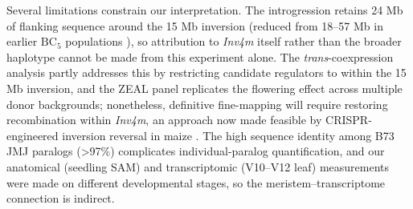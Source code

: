 \documentclass[9pt,twocolumn,twoside]{rilabRxiv}
\newcommand{\mex}{\textit{mexicana}\xspace}
\newcommand{\invfour}{\textit{Inv4m}\xspace}
\begin{document}
Several limitations constrain our interpretation.
The introgression retains 24 Mb of flanking sequence around the 15 Mb inversion (reduced from 18--57 Mb in earlier $\text{BC}_5$ populations \citep{crow2020}), so attribution to \invfour itself rather than the broader haplotype cannot be made from this experiment alone.
The \textit{trans}-coexpression analysis partly addresses this by restricting candidate regulators to within the 15 Mb inversion, and the ZEAL panel replicates the flowering effect across multiple donor backgrounds; nonetheless, definitive fine-mapping will require restoring recombination within \invfour, an approach now made feasible by CRISPR-engineered inversion reversal in maize \citep{Schwartz2020-el}.
The high sequence identity among B73 JMJ paralogs (>97\%) complicates individual-paralog quantification, and our anatomical (seedling SAM) and transcriptomic (V10--V12 leaf) measurements were made on different developmental stages, so the meristem--transcriptome connection is indirect.
\end{document}
